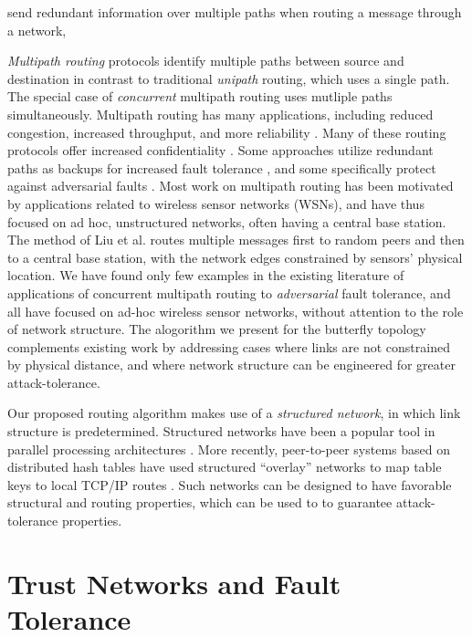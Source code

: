 \documentclass{sig-alternate-05-2015}
\begin{document}
send redundant information
over multiple paths when routing a message through a network,

{\em Multipath routing} protocols identify multiple paths between
source and destination
in contrast to traditional {\em unipath} routing, which uses
a single path.
The special case of {\em concurrent} multipath routing uses mutliple paths
simultaneously.
Multipath routing has many applications, including reduced congestion,
increased throughput, and more reliability
\cite{qadir_exploiting_2015}.
Many of these routing protocols offer increased confidentiality
\cite{zin_survey_2015}.
Some approaches utilize redundant paths as backups for increased
fault tolerance
\cite{alrajeh_secure_2013},
and some specifically protect against adversarial faults
\cite{kohno_improvement_2012, khalil_unmask:_2010, lou_h-spread:_2006}.
Most work on multipath routing has been motivated by applications related to
wireless sensor networks (WSNs),
and have thus focused on ad hoc, unstructured networks, often having a central
base station.
The method of Liu et al.
\cite{liu_secure_2012}
routes multiple messages first to random peers and then
to a central base station,
with the network edges constrained by sensors' physical location.
We have found only few examples in the existing literature of applications of
concurrent multipath routing to {\em adversarial} fault tolerance,
and all have focused on ad-hoc wireless sensor networks, without attention
to the role of network structure.
The alogorithm we present for the butterfly topology complements existing work
by addressing cases where links are not constrained by physical
distance,
and where network structure can be engineered for greater attack-tolerance.

Our proposed routing algorithm makes use of a
{\em structured network}, in which link structure is predetermined.
Structured networks have been a popular tool in parallel processing
architectures \cite{kshemkalyani_distributed_2008}.
More recently, peer-to-peer systems based on distributed hash tables have used
structured ``overlay'' networks to map table keys to local TCP/IP routes
\cite{lua_survey_2005,korzun_structured_2013}.
Such networks can be designed to have favorable structural and routing
properties,
which can be used to to guarantee attack-tolerance properties.

\section{Trust Networks and Fault Tolerance}
\label{sec-ft}
\end{document}
